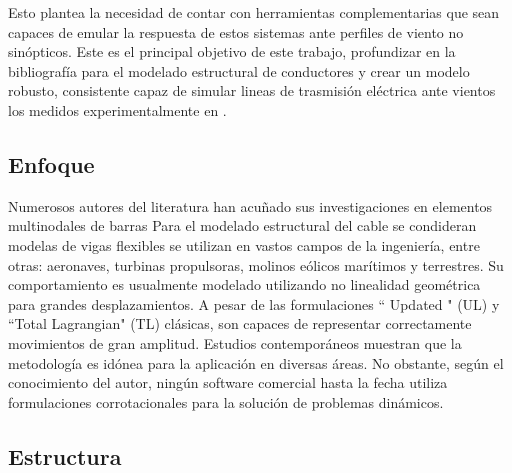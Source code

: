 Esto plantea la necesidad de contar con herramientas complementarias que sean capaces de emular la respuesta de estos sistemas ante perfiles de viento no sinópticos. Este es el principal objetivo de este trabajo, profundizar en la bibliografía para el modelado estructural de conductores y crear un modelo robusto, consistente capaz de simular lineas de trasmisión eléctrica ante vientos los medidos experimentalmente en \cite{stengel2017measurements}. 
  

\subsection{Enfoque}
Numerosos autores del literatura han acuñado sus investigaciones en elementos multinodales de barras \cite{desai1995finite}Para el modelado estructural del cable se condideran modelas de vigas flexibles se utilizan en vastos campos de la ingeniería, entre otras: aeronaves, turbinas propulsoras, molinos eólicos marítimos y terrestres. Su comportamiento es usualmente modelado utilizando no linealidad geométrica para grandes desplazamientos. A pesar de las formulaciones `` Updated " (UL) y ``Total Lagrangian" (TL) clásicas, son capaces de representar correctamente movimientos de gran amplitud. Estudios contemporáneos \citet{albino2018co}\citet{asadi2019multibody}  muestran que la metodología es idónea para la aplicación en diversas áreas. No obstante, según el conocimiento del autor, ningún software comercial hasta la fecha utiliza formulaciones corrotacionales para la solución de problemas dinámicos. 
\subsection{Estructura}